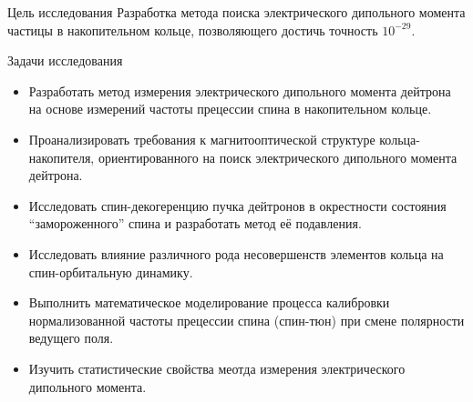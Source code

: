 \documentclass[14pt]{beamer}
\begin{document}
\begin{frame}{Цель исследования}
Разработка метода поиска электрического дипольного момента частицы в накопительном кольце, 
позволяющего достичь точность $10^{-29}$\ecm.
\end{frame}
\begin{frame}{Задачи исследования}
	\begin{itemize}
		\item Разработать метод измерения электрического дипольного момента дейтрона на основе измерений частоты прецессии спина в накопительном кольце.
		\item Проанализировать требования к магнитооптической структуре кольца-накопителя, ориентированного на поиск электрического дипольного момента дейтрона.
		\item Исследовать спин-декогеренцию пучка дейтронов в окрестности состояния ``замороженного'' спина и разработать метод её подавления. 
	\end{itemize}
\end{frame}
\begin{frame}
	\begin{itemize} 
		\item Исследовать влияние различного рода несовершенств элементов кольца на спин-орбитальную динамику. 
		\item Выполнить математическое моделирование процесса калибровки нормализованной частоты прецессии спина (спин-тюн) при смене полярности ведущего поля.
		\item Изучить статистические свойства меотда измерения электрического дипольного момента.
	\end{itemize}
\end{frame}
\end{document}
